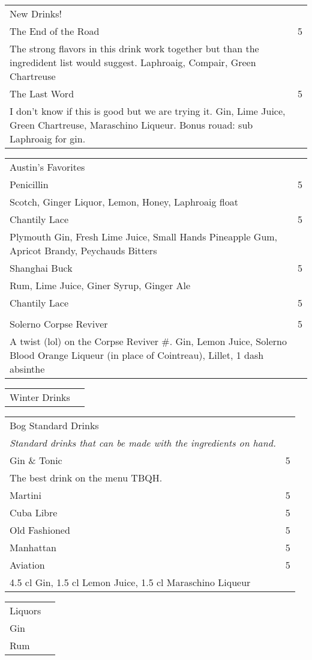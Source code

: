 \documentclass[12pt]{article}
\makeatletter
\newcommand*\ColText[1]{\textcolor{Goldenrod3}{#1}}
\newenvironment{Group}[1]
  {\noindent\begin{tabular*}{\textwidth}{@{}p{.8\linewidth}@{\extracolsep{\fill}}r@{}}
    {\fontsize{24}{29}\selectfont\ColText{#1}}\\[0.8em]}
  {\end{tabular*}}
\newcommand*\Entry[2]{%
  \sffamily#1 & #2}
\newcommand*\Expl[1]{
  \hspace*{1em}\footnotesize #1}
\newcommand*\HowToMake[1]{
  \hspace*{1em}\footnotesize #1
}
\makeatother
\begin{document}
\begin{Group}{New Drinks!}
\Entry{The End of the Road}{5} \\
\Expl{The strong flavors in this drink work together but than the ingredident list would suggest. Laphroaig, Compair, Green Chartreuse} \\
\Entry{The Last Word}{5} \\
\Expl{I don't know if this is good but we are trying it. Gin, Lime Juice, Green Chartreuse, Maraschino Liqueur. Bonus rouad: sub Laphroaig for gin.} \\
\end{Group}

\vfill

\begin{Group}{Austin's Favorites}
\Entry{Penicillin}{5} \\
\Expl{Scotch, Ginger Liquor, Lemon, Honey, Laphroaig float} \\
\Entry{Chantily Lace}{5} \\
\Expl{Plymouth Gin, Fresh Lime Juice, Small Hands Pineapple Gum, Apricot Brandy, Peychauds Bitters} \\
\Entry{Shanghai Buck}{5} \\
\Expl{Rum, Lime Juice, Giner Syrup, Ginger Ale} \\
\Entry{Chantily Lace}{5} \\
\Expl{} \\
\Entry{Solerno Corpse Reviver}{5} \\
\Expl{A twist (lol) on the Corpse Reviver \#. Gin, Lemon Juice, Solerno Blood Orange Liqueur (in place of Cointreau), Lillet, 1 dash absinthe} \\
\end{Group}

\vfill

\begin{Group}{Winter Drinks}
\end{Group}

\vfill

\begin{Group}{Bog Standard Drinks}
\emph{Standard drinks that can be made with the ingredients on hand.} \\
\Entry{Gin \& Tonic}{5} \\
\Entry{The best drink on the menu TBQH.} \\
\Entry{Martini}{5} \\
\Entry{Cuba Libre}{5} \\
\Entry{Old Fashioned}{5} \\
\Entry{Manhattan}{5} \\
\Entry{Aviation}{5} \\
\HowToMake{4.5 cl Gin, 1.5 cl Lemon Juice, 1.5 cl Maraschino Liqueur} \\
\end{Group}

\vfill

\begin{Group}{Liquors}
\Entry{Gin}{} \\
\Entry{Rum}{} \\
\end{Group}
\end{document}
